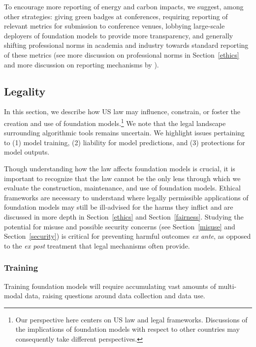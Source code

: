 To encourage more reporting of energy and carbon impacts, we suggest, among other strategies: giving green badges at conferences, requiring reporting of relevant metrics for submission to conference venues, lobbying large-scale deployers of foundation models to provide more transparency, and generally shifting professional norms in academia and industry towards standard reporting of these metrics (see more discussion on professional norms in Section~\ref{ethics} and more discussion on reporting mechanisms by \citet{henderson2020towards}).

\newsection
\subsection{Legality}
\label{sec:legality}

In this section, we describe how US law may influence, constrain, or foster the creation and use of foundation models.\footnote{Our perspective here centers on US law and legal frameworks. Discussions of the implications of foundation models with respect to other countries may consequently take different perspectives.} We note that the legal landscape surrounding algorithmic tools remains uncertain. We highlight issues pertaining to (1) model training, (2) liability for model predictions, and (3) protections for model outputs. 

Though understanding how the law affects foundation models is crucial, it is important to recognize that the law cannot be the only lens through which we evaluate the construction, maintenance, and use of foundation models. Ethical frameworks are necessary to understand where legally permissible applications of foundation models may still be ill-advised for the harms they inflict and are discussed in more depth in Section~\ref{ethics} and Section~\ref{fairness}. Studying the potential for misuse and possible security concerns (see Section~\ref{misuse} and Section~\ref{security}) is critical for preventing harmful outcomes \textit{ex ante}, as opposed to the \textit{ex post} treatment that legal mechanisms often provide.

\subsubsection{Training}
Training foundation models will require accumulating vast amounts of multi-modal data, raising questions around data collection and data use. 

